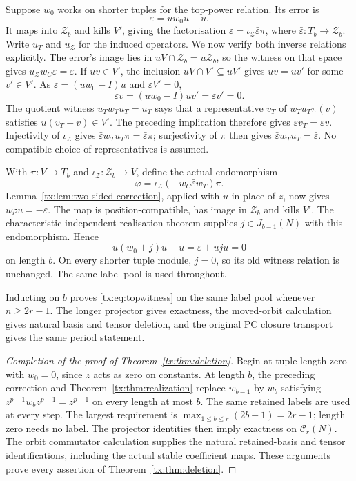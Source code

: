 Suppose $w_0$ works on shorter tuples for the top-power relation. Its error is
\[\varepsilon=uw_0u-u.
\]
It maps into $\mathcal Z_b$ and kills $V'$, giving the factorisation
$\varepsilon=\iota_{\mathcal Z}\bar\varepsilon\pi$, where
$\bar\varepsilon:T_b\to\mathcal Z_b$. Write $u_T$ and
$u_{\mathcal Z}$ for the induced operators. We now verify both inverse
relations explicitly. The error's image lies in
$uV\cap\mathcal Z_b=u\mathcal Z_b$, so the witness on that
space gives $u_{\mathcal Z}w_C\bar\varepsilon=\bar\varepsilon$.
If $uv\in V'$, the
inclusion $uV\cap V'\subseteq uV'$ gives $uv=uv'$ for some
$v'\in V'$. As $\varepsilon=(uw_0-I)u$ and $\varepsilon V'=0$,
\[
                  \varepsilon v=(uw_0-I)uv'
                                  =\varepsilon v'=0.
\]
The quotient witness $u_Tw_Tu_T=u_T$ says that a representative
$v_T$ of $w_Tu_T\pi(v)$ satisfies $u(v_T-v)\in V'$. The preceding
implication therefore gives $\varepsilon v_T=\varepsilon v$.
Injectivity of $\iota_{\mathcal Z}$ gives
$\bar\varepsilon w_Tu_T\pi=\bar\varepsilon\pi$; surjectivity of
$\pi$ then gives $\bar\varepsilon w_Tu_T=\bar\varepsilon$.
No compatible choice of representatives is assumed.

With $\pi:V\to T_b$ and $\iota_{\mathcal Z}:\mathcal Z_b\to V$,
define the actual endomorphism
\[
       \varphi=\iota_{\mathcal Z}
                      (-w_C\bar\varepsilon w_T)\pi.
\]
Lemma~\ref{tx:lem:two-sided-correction}, applied with $u$ in place
of $z$, now gives $u\varphi u=-\varepsilon$. The map
is position-compatible, has image in $\mathcal Z_b$ and kills $V'$.
The characteristic-independent realisation theorem supplies
$j\in J_{b-1}(N)$ with this endomorphism. Hence
\[
        u(w_0+j)u-u=\varepsilon+uju=0
\]
on length $b$. On every shorter tuple module, $j=0$, so its old
witness relation is unchanged. The same label pool is used throughout.

Inducting on $b$ proves \eqref{tx:eq:topwitness} on the same label pool whenever $n\ge2r-1$. The longer projector gives exactness, the moved-orbit calculation gives natural basis and tensor deletion, and the original PC closure transport gives the same period statement.


\begin{proof}[Completion of the proof of Theorem~\ref{tx:thm:deletion}]
Begin at tuple length zero with $w_0=0$, since $z$ acts as zero on
constants. At length $b$, the preceding correction and
Theorem~\ref{tx:thm:realization} replace $w_{b-1}$ by $w_b$ satisfying
$z^{p-1}w_bz^{p-1}=z^{p-1}$ on every length at most $b$. The same
retained labels are used at every step. The largest requirement is
$\max_{1\le b\le r}(2b-1)=2r-1$; length zero needs no label.
The projector identities then imply exactness on $\mathcal C_r(N)$.
The orbit commutator calculation supplies the natural retained-basis
and tensor identifications, including the actual stable coefficient
maps. These arguments prove every assertion of Theorem~\ref{tx:thm:deletion}.
\end{proof}

